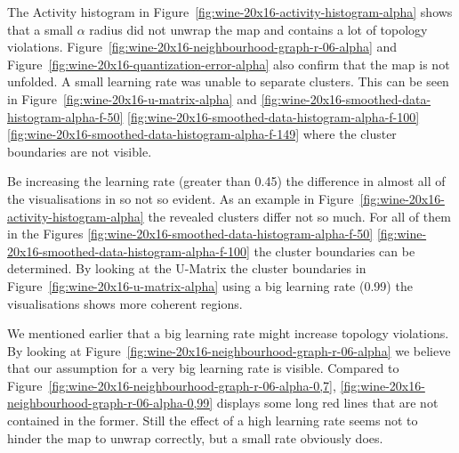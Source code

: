 \documentclass{acm_proc_article-sp}
\begin{document}
The Activity histogram in Figure~\ref{fig:wine-20x16-activity-histogram-alpha} shows that a small $\alpha$ radius did not unwrap the map and contains
a lot of topology violations. Figure~\ref{fig:wine-20x16-neighbourhood-graph-r-06-alpha} and Figure~\ref{fig:wine-20x16-quantization-error-alpha} also confirm that the map is not unfolded.
A small learning rate was unable to separate clusters. This can be seen in Figure~\ref{fig:wine-20x16-u-matrix-alpha}
and
\ref{fig:wine-20x16-smoothed-data-histogram-alpha-f-50}
\ref{fig:wine-20x16-smoothed-data-histogram-alpha-f-100}
\ref{fig:wine-20x16-smoothed-data-histogram-alpha-f-149}
where the cluster boundaries are not visible.

Be increasing the learning rate (greater than 0.45) the difference in almost all of the visualisations in so not so evident.
As an example in Figure~\ref{fig:wine-20x16-activity-histogram-alpha} the revealed clusters differ not so much. For all of 
them in the Figures
\ref{fig:wine-20x16-smoothed-data-histogram-alpha-f-50}
\ref{fig:wine-20x16-smoothed-data-histogram-alpha-f-100}
the cluster boundaries can be determined. By looking at the U-Matrix the cluster boundaries in Figure~\ref{fig:wine-20x16-u-matrix-alpha}
using a big learning rate (0.99) the visualisations shows more coherent regions.

We mentioned earlier that a big learning rate might increase topology violations.
By looking at Figure~\ref{fig:wine-20x16-neighbourhood-graph-r-06-alpha} we believe that our assumption for
a very big learning rate is visible. Compared to Figure~\ref{fig:wine-20x16-neighbourhood-graph-r-06-alpha-0,7},
\ref{fig:wine-20x16-neighbourhood-graph-r-06-alpha-0,99} displays some long red lines that are not contained in the former.
Still the effect of a high learning rate seems not to hinder the map to unwrap correctly, but a small rate obviously does.
\end{document}
